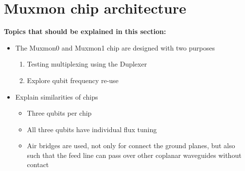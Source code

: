 \documentclass[12pt]{report}
\begin{document}
  \chapter{Muxmon chip architecture}

    \textbf{Topics that should be explained in this section:}
    \begin{itemize}
      \item The Muxmon0 and Muxmon1 chip are designed with two purposes
      \begin{enumerate}
        \item Testing multiplexing using the Duplexer
        \item Explore qubit frequency re-use
      \end{enumerate}

      \item Explain similarities of chips
      \begin{itemize}
        \item Three qubits per chip
        \item All three qubits have individual flux tuning
        \item Air bridges are used, not only for connect the ground planes, but also such that the feed line can pass over other coplanar waveguides without contact \\
      \end{itemize}


\end{itemize}
\end{document}
